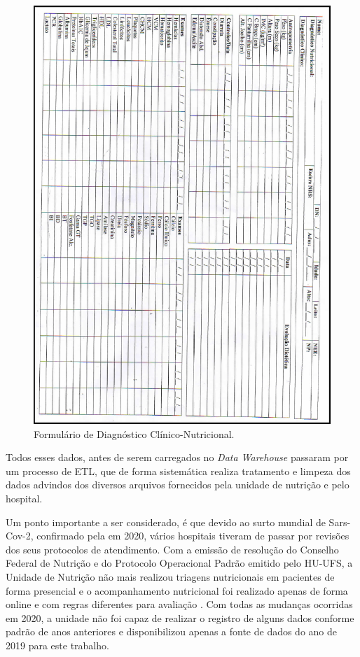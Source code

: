 \begin{figure}[htb]
	\caption{\label{fig_figuraFormularioDiagClinicoNutri}Formulário de Diagnóstico Clínico-Nutricional.}
	\begin{center}
	    \includegraphics[scale=0.569]{Imagens/figura - formulario diagnostico clinico nutricional.png}
	\end{center}
\end{figure}

Todos esses dados, antes de serem carregados no \textit{Data Warehouse} passaram por um processo de ETL, que de forma sistemática realiza tratamento e limpeza dos dados advindos dos diversos arquivos fornecidos pela unidade de nutrição e pelo hospital. 

Um ponto importante a ser considerado, é que devido ao surto mundial de Sars-Cov-2, confirmado pela  em 2020, vários hospitais tiveram de passar por revisões dos seus protocolos de atendimento. Com a emissão de resolução do Conselho Federal de Nutrição e do Protocolo Operacional Padrão emitido pelo HU-UFS, a Unidade de Nutrição não mais realizou triagens nutricionais em pacientes de forma presencial e o acompanhamento nutricional foi realizado apenas de forma online e com regras diferentes para avaliação \cite{protocolocovidnutri, cfnutri646}. Com todas as mudanças ocorridas em 2020, a unidade não foi capaz de realizar o registro de alguns dados conforme padrão de anos anteriores e disponibilizou apenas a fonte de dados do ano de 2019 para este trabalho.

